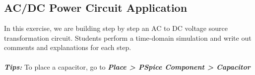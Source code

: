 
\subsection{AC/DC Power Circuit Application}
In this exercise, we are building step by step an AC to DC voltage source transformation circuit. Students perform a time-domain simulation and write out comments and explanations for each step.\\
\\
\textbf{\textit{Tips: }} To place a capacitor, go to \textbf{\textit{Place > PSpice Component > Capacitor}}

